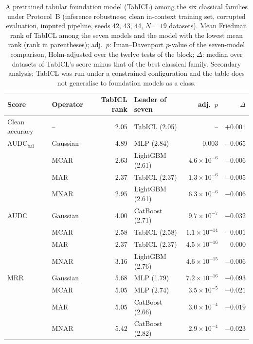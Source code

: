\begin{table}[t]
\centering
\footnotesize
\caption{A pretrained tabular foundation model (TabICL) among the six classical families under Protocol~B (inference robustness; clean in-context training set, corrupted evaluation, imputed pipeline, seeds 42, 43, 44, $N=19$ datasets). Mean Friedman rank of TabICL among the seven models and the model with the lowest mean rank (rank in parentheses); adj.\ $p$: Iman--Davenport $p$-value of the seven-model comparison, Holm-adjusted over the twelve tests of the block; $\Delta$: median over datasets of TabICL's score minus that of the best classical family. Secondary analysis; TabICL was run under a constrained configuration and the table does not generalise to foundation models as a class.}
\label{tab:foundation}
\begin{tabular}{@{}llrlrr@{}}
\toprule
Score & Operator & TabICL rank & Leader of seven & adj.\ $p$ & $\Delta$ \\
\midrule
Clean accuracy & -- & 2.05 & TabICL (2.05) & -- & $+0.001$ \\
\midrule
AUDC$_{\mathrm{bal}}$ & Gaussian & 4.89 & MLP (2.84) & 0.003 & $-0.065$ \\
 & MCAR & 2.63 & LightGBM (2.61) & $4.6\times10^{-6}$ & $-0.006$ \\
 & MAR & 2.37 & TabICL (2.37) & $1.3\times10^{-6}$ & $-0.005$ \\
 & MNAR & 2.95 & LightGBM (2.61) & $6.3\times10^{-6}$ & $-0.006$ \\
\midrule
AUDC & Gaussian & 4.00 & CatBoost (2.71) & $9.7\times10^{-7}$ & $-0.032$ \\
 & MCAR & 2.58 & TabICL (2.58) & $1.1\times10^{-14}$ & $-0.001$ \\
 & MAR & 2.37 & TabICL (2.37) & $4.5\times10^{-16}$ & $0.000$ \\
 & MNAR & 3.16 & LightGBM (2.76) & $4.6\times10^{-15}$ & $-0.006$ \\
\midrule
MRR & Gaussian & 5.68 & MLP (1.79) & $7.2\times10^{-16}$ & $-0.093$ \\
 & MCAR & 5.05 & MLP (2.74) & $3.5\times10^{-5}$ & $-0.021$ \\
 & MAR & 5.05 & CatBoost (2.66) & $3.0\times10^{-4}$ & $-0.019$ \\
 & MNAR & 5.42 & CatBoost (2.82) & $2.9\times10^{-4}$ & $-0.023$ \\
\bottomrule
\end{tabular}
\end{table}
